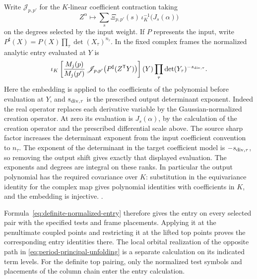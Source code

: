 Write \(\mathscr J_{p,p'}\) for the \(K\)-linear
coefficient contraction taking
\[
  Z^\alpha\longmapsto
       \sum_s\Xi_{p,p'}(s)\,\iota_K^{-1}\bigl(J_s(\alpha)\bigr)
\]
on the degrees selected by the input weight.
If \(P\) represents the input, write
\(P^\sharp(X)=P(X)\prod_\tau\det(X_\tau)^{n_\tau}\).
In the fixed complex frames the normalized analytic
entry evaluated at \(Y\) is
\begin{equation}
 \label{eq:definite-normalized-entry}
 \iota_K\left[
  \frac{M_j(p)}{M_j(p')}\,
  \mathscr J_{p,p'}\!\left(P^\sharp(Z^{\mathsf T}Y)\right)
 \right](Y)
       \prod_\tau\det(Y_\tau)^{-s_{{\rm div},\tau}} .
\end{equation}
Here the embedding is applied to the coefficients
of the polynomial before evaluation at \(Y\), and
\(s_{{\rm div},\tau}\) is the prescribed output
determinant exponent. Indeed the real operator
replaces each derivative variable by the
Gaussian-normalized creation operator. At zero its
evaluation is \(J_s(\alpha)\), by the calculation
of the creation operator and the prescribed
differential scale above. The source sharp factor
increases the determinant exponent from the
input coefficient convention to \(n_\tau\).
The exponent of the determinant in the
target coefficient model is \(-s_{{\rm div},\tau}\),
so removing the output shift gives exactly
that displayed evaluation. The exponents and
degrees are integral on these ranks. In particular
the output polynomial has the required covariance
over \(K\): substitution in the equivariance
identity for the complex map gives polynomial
identities with coefficients in \(K\), and the
embedding is injective.
.

Formula~\eqref{eq:definite-normalized-entry} therefore
gives the entry on every selected pair with the
specified tests and frame placements. Applying it at
the penultimate coupled points and restricting it
at the lifted top points proves the corresponding
entry identities there. The local orbital
realization of the opposite path in
\eqref{eq:period-principal-unfolding} is a separate
calculation on its indicated term levels. For the
definite top pairing, only the normalized test symbols
and placements of the column chain enter the entry
calculation.

